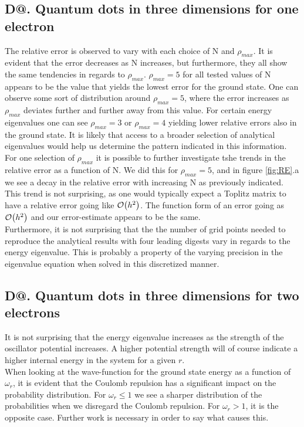 \documentclass[%
reprint,
amsmath,amssymb,
aps,
]{revtex4-1}
\makeatletter
\newcommand*{\rom}[1]{\expandafter\@slowromancap\romannumeral #1@}
\makeatother
\begin{document}
\subsection*{D\rom{2}. Quantum dots in three dimensions for one electron} \noindent 
The relative error is observed to vary with each choice of N and $\rho_{max}$. It is evident that the error decreases as N increases, but furthermore, they all show the same tendencies in regards to $\rho_{max}$. $\rho_{max} = 5$ for all tested values of N appears to be the value that yields the lowest error for the ground state. One can observe some sort of distribution around $\rho_{max} = 5$, where the error increases as $\rho_{max}$ deviates further and further away from this value. For certain energy eigenvalues one can see $\rho_{max} = 3$ or $\rho_{max} = 4$ yielding lower relative errors also in the ground state. It is likely that access to a broader selection of analytical eigenvalues would help us determine the pattern indicated in this information. \\ \indent 
For one selection of $\rho_{max}$ it is possible to further investigate tshe trends in the relative error as a function of N. We did this for $\rho_{max} = 5$, and in figure \ref{fig:RE}.a we see a decay in the relative error with increasing N as previously indicated. This trend is not surprising, as one would typically expect a Toplitz matrix to have a relative error going like $\order{h^2}$. The function form of an error going as $\order{h^2}$ and our error-estimate appears to be the same. \\ \indent 
Furthermore, it is not surprising that the the number of grid points needed to reproduce the analytical results with four leading digests vary in regards to the energy eigenvalue. This is probably a property of the varying precision in the eigenvalue equation when solved in this discretized manner.  

\subsection*{D\rom{3}. Quantum dots in three dimensions for two electrons} \noindent 
It is not surprising that the energy eigenvalue increases as the strength of the oscillator potential increases. A higher potential strength will of course indicate a higher internal energy in the system for a given $r$.  \\
When looking at the wave-function for the ground state energy as a function of $\omega_r$, it is evident that the Coulomb repulsion has a significant impact on the probability distribution. For $\omega_r \leq 1 $ we see a sharper distribution of the probabilities when we disregard the Coulomb repulsion. For $\omega_r > 1$, it is the opposite case. Further work is necessary in order to say what causes this. 
\end{document}
